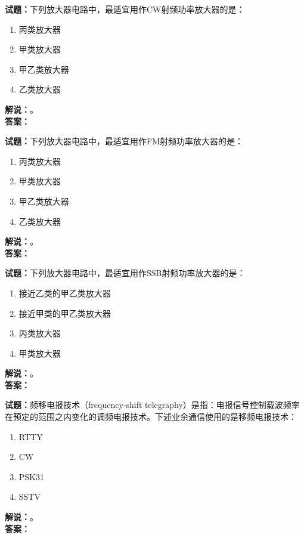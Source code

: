 \documentclass{ctexbook}
\begin{document}
\bigskip

\noindent\textbf{试题：}下列放大器电路中，最适宜用作CW射频功率放大器的是：
\begin{enumerate}[leftmargin=3em]
  \item 丙类放大器
  \item 甲类放大器
  \item 甲乙类放大器
  \item 乙类放大器
\end{enumerate}
\noindent\textbf{解说：}\textbf{}。\\\noindent\textbf{答案：}

\bigskip

\noindent\textbf{试题：}下列放大器电路中，最适宜用作FM射频功率放大器的是：
\begin{enumerate}[leftmargin=3em]
  \item 丙类放大器
  \item 甲类放大器
  \item 甲乙类放大器
  \item 乙类放大器
\end{enumerate}
\noindent\textbf{解说：}\textbf{}。\\\noindent\textbf{答案：}

\bigskip

\noindent\textbf{试题：}下列放大器电路中，最适宜用作SSB射频功率放大器的是：
\begin{enumerate}[leftmargin=3em]
  \item 接近乙类的甲乙类放大器
  \item 接近甲类的甲乙类放大器
  \item 丙类放大器
  \item 甲类放大器
\end{enumerate}
\noindent\textbf{解说：}\textbf{}。\\\noindent\textbf{答案：}

\bigskip

\noindent\textbf{试题：}频移电报技术（frequency-shift telegraphy）是指：电报信号控制载波频率在预定的范围之内变化的调频电报技术。下述业余通信使用的是移频电报技术：
\begin{enumerate}[leftmargin=3em]
  \item RTTY
  \item CW
  \item PSK31
  \item SSTV
\end{enumerate}
\noindent\textbf{解说：}\textbf{}。\\\noindent\textbf{答案：}
\end{document}
